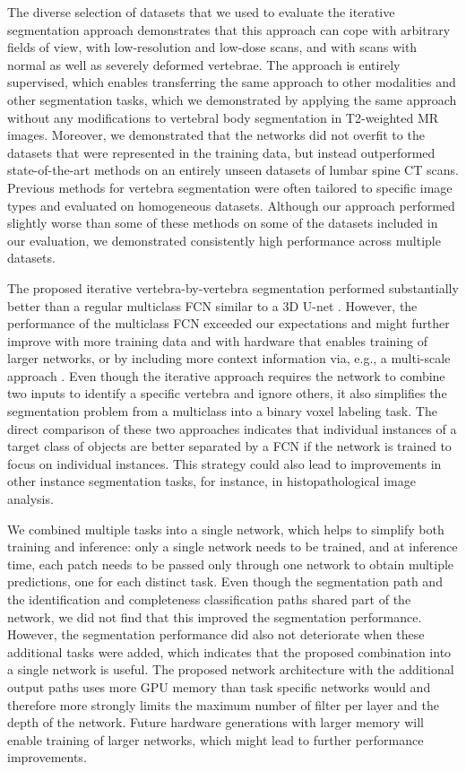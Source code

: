 \documentclass[authoryear,5p,final,times]{elsarticle}
\begin{document}
    The diverse selection of datasets that we used to evaluate the iterative segmentation approach demonstrates that this approach can cope with arbitrary fields of view, with low-resolution and low-dose scans, and with scans with normal as well as severely deformed vertebrae. The approach is entirely supervised, which enables transferring the same approach to other modalities and other segmentation tasks, which we demonstrated by applying the same approach without any modifications to vertebral body segmentation in T2-weighted MR images. Moreover, we demonstrated that the networks did not overfit to the datasets that were represented in the training data, but instead outperformed state-of-the-art methods on an entirely unseen datasets of lumbar spine CT scans.
    Previous methods for vertebra segmentation were often tailored to specific image types and evaluated on homogeneous datasets. Although our approach performed slightly worse than some of these methods on some of the datasets included in our evaluation, we demonstrated consistently high performance across multiple datasets.

    The proposed iterative vertebra-by-vertebra segmentation performed substantially better than a regular multiclass FCN similar to a 3D U-net \citep{Cicek2016}. However, the performance of the multiclass FCN exceeded our expectations and might further improve with more training data and with hardware that enables training of larger networks, or by including more context information via, e.g., a multi-scale approach \citep{Moeskops2016,Kamnitsas2017}. Even though the iterative approach requires the network to combine two inputs to identify a specific vertebra and ignore others, it also simplifies the segmentation problem from a multiclass into a binary voxel labeling task. The direct comparison of these two approaches indicates that individual instances of a target class of objects are better separated by a FCN if the network is trained to focus on individual instances. This strategy could also lead to improvements in other instance segmentation tasks, for instance, in histopathological image analysis.

    We combined multiple tasks into a single network, which helps to simplify both training and inference: only a single network needs to be trained, and at inference time, each patch needs to be passed only through one network to obtain multiple predictions, one for each distinct task. Even though the segmentation path and the identification and completeness classification paths shared part of the network, we did not find that this improved the segmentation performance. However, the segmentation performance did also not deteriorate when these additional tasks were added, which indicates that the proposed combination into a single network is useful. The proposed network architecture with the additional output paths uses more GPU memory than task specific networks would and therefore more strongly limits the maximum number of filter per layer and the depth of the network. Future hardware generations with larger memory will enable training of larger networks, which might lead to further performance improvements.
\end{document}
